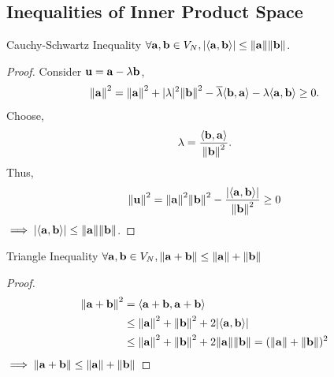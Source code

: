 \documentclass{book}
\def\innerproduct#1#2{{\langle #1},{#2 \rangle}}
\begin{document}
\subsection{Inequalities of Inner Product Space}
\begin{Theorems}{Cauchy-Schwartz Inequality}{}
	$\forall \vb{a},\vb{b} \in V_N, \abs{\innerproduct{\vb{a}}{\vb{b}}} \leq \norm{\vb{a}}\norm{\vb{b}}$.
\end{Theorems}
\begin{proof}
	Consider $\vb{u} = \vb{a} - \lambda\vb{b}$,
	\begin{equation}
		\norm{\vb{a}}^2 = \norm{\vb{a}}^2 + |\lambda|^2\norm{\vb{b}}^2 - \overline{\lambda}\innerproduct{\vb{b}}{\vb{a}} - \lambda\innerproduct{\vb{a}}{\vb{b}} \geq 0.
	\end{equation}
Choose, 
\begin{equation}
	\lambda = \frac{\innerproduct{\vb{b}}{\vb{a}}}{\norm{\vb{b}}^2}.
\end{equation}
Thus,
\begin{equation}
	\begin{split}
		\norm{\vb{u}}^2 = \norm{\vb{a}}^2 \norm{\vb{b}}^2 - \frac{\abs{\innerproduct{\vb{a}}{\vb{b}}}}{\norm{\vb{b}}^2} \geq 0
	\end{split}
\end{equation}
$\implies \abs{\innerproduct{\vb{a}}{\vb{b}}} \leq \norm{\vb{a}}\norm{\vb{b}}$.
\end{proof}
\begin{Theorems}{Triangle Inequality}{}
	$\forall \vb{a},\vb{b} \in V_N, \norm{\vb{a} + \vb{b}}  \leq \norm{\vb{a}} + \norm{\vb{b}}$
\end{Theorems}
\begin{proof}
	\begin{equation}
		\begin{split}
		\norm{\vb{a} + \vb{b}}^2 & = \innerproduct{\vb{a} + \vb{b}}{\vb{a} + \vb{b}} \\
		& \leq \norm{\vb{a}}^2 + \norm{\vb{b}}^2 + 2\abs{\innerproduct{\vb{a}}{\vb{b}}} \\
		& \leq \norm{\vb{a}}^2 + \norm{\vb{b}}^2 + 2\norm{\vb{a}}\norm{\vb{b}} = (\norm{\vb{a}} + \norm{\vb{b}})^2
		\end{split}
	\end{equation}
	$\implies \norm{\vb{a} + \vb{b}} \leq \norm{\vb{a}} + \norm{\vb{b}}$
\end{proof}
\end{document}
